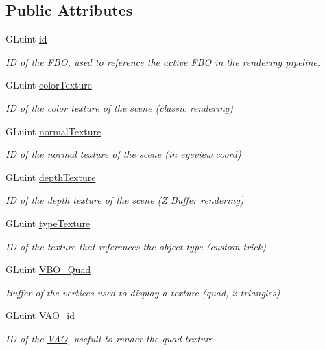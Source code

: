 \subsection*{Public Attributes}
\begin{DoxyCompactItemize}
\item 
G\+Luint \hyperlink{struct_render_1_1_low_level_wrapper_1_1_g_buffer_a73b756833b81a07d96bbb2c7928349cf}{id}
\begin{DoxyCompactList}\small\item\em ID of the F\+BO, used to reference the active F\+BO in the rendering pipeline. \end{DoxyCompactList}\item 
G\+Luint \hyperlink{struct_render_1_1_low_level_wrapper_1_1_g_buffer_aedd59e52f0f2bc1e3188670fa41a4549}{color\+Texture}
\begin{DoxyCompactList}\small\item\em ID of the color texture of the scene (classic rendering) \end{DoxyCompactList}\item 
G\+Luint \hyperlink{struct_render_1_1_low_level_wrapper_1_1_g_buffer_a783de412de35f563a1a2d9627d533dd8}{normal\+Texture}
\begin{DoxyCompactList}\small\item\em ID of the normal texture of the scene (in eyeview coord) \end{DoxyCompactList}\item 
G\+Luint \hyperlink{struct_render_1_1_low_level_wrapper_1_1_g_buffer_ae43189afa9a4b5514be7175321a85ab2}{depth\+Texture}
\begin{DoxyCompactList}\small\item\em ID of the depth texture of the scene (Z Buffer rendering) \end{DoxyCompactList}\item 
G\+Luint \hyperlink{struct_render_1_1_low_level_wrapper_1_1_g_buffer_aade11a19af8305cda85c90a46fea97c2}{type\+Texture}
\begin{DoxyCompactList}\small\item\em ID of the texture that references the object type (custom trick) \end{DoxyCompactList}\item 
G\+Luint \hyperlink{struct_render_1_1_low_level_wrapper_1_1_g_buffer_afd4d0ed8061d9c841219e0109ffa6d13}{V\+B\+O\+\_\+\+Quad}
\begin{DoxyCompactList}\small\item\em Buffer of the vertices used to display a texture (quad, 2 triangles) \end{DoxyCompactList}\item 
G\+Luint \hyperlink{struct_render_1_1_low_level_wrapper_1_1_g_buffer_a183d9f3483e625bc08a366966a9804d2}{V\+A\+O\+\_\+id}
\begin{DoxyCompactList}\small\item\em ID of the \hyperlink{struct_render_1_1_low_level_wrapper_1_1_v_a_o}{V\+AO}, usefull to render the quad texture. \end{DoxyCompactList}\end{DoxyCompactItemize}


